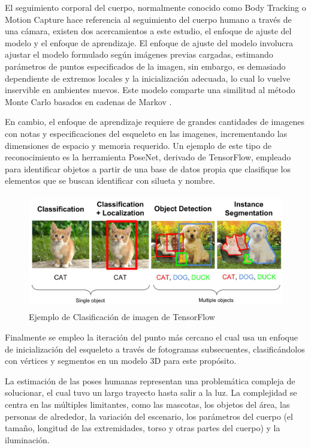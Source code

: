 El seguimiento corporal del cuerpo, normalmente conocido como Body Tracking o Motion Capture hace referencia al seguimiento del cuerpo humano a través de una cámara, existen dos acercamientos a este estudio, el enfoque de ajuste del modelo y el enfoque de aprendizaje. El enfoque de ajuste del modelo involucra ajustar el modelo formulado según imágenes previas cargadas, estimando parámetros de puntos especificados de la imagen, sin embargo, es demasiado dependiente de extremos locales y la inicialización adecuada, lo cual lo vuelve inservible en ambientes nuevos. Este modelo comparte una similitud al método Monte Carlo basados en cadenas de Markov \cite{siddiqui2010human}.

En cambio, el enfoque de aprendizaje requiere de grandes cantidades de imagenes con notas y especificaciones del esqueleto en las imagenes, incrementando las dimensiones de espacio y memoria requerido. Un ejemplo de este tipo de reconocimiento es la herramienta PoseNet, derivado de TensorFlow, empleado para identificar objetos a partir de una base de datos propia que clasifique los elementos que se buscan identificar con silueta y nombre.

\begin{figure}[t!]
	\centering
	\includegraphics[width=13cm,height=5cm,]{./Images/ejemplotensorflow.jpg}
	\caption{Ejemplo de Clasificación de imagen de TensorFlow}
	\label{tensorfl}
\end{figure}

Finalmente se empleo la iteración del punto más cercano \cite{grest2005nonlinear} el cual usa un enfoque de inicialización del esqueleto a través de fotogramas subsecuentes, clasificándolos con vértices y segmentos en un modelo 3D para este propósito.

La estimación de las poses humanas representan una problemática compleja de solucionar, el cual tuvo un largo trayecto hasta salir a la luz. La complejidad se centra en las múltiples limitantes, como las mascotas, los objetos del área, las personas de alrededor, la variación del escenario, los parámetros del cuerpo (el tamaño, longitud de las extremidades, torso y otras partes del cuerpo) y la iluminación.

